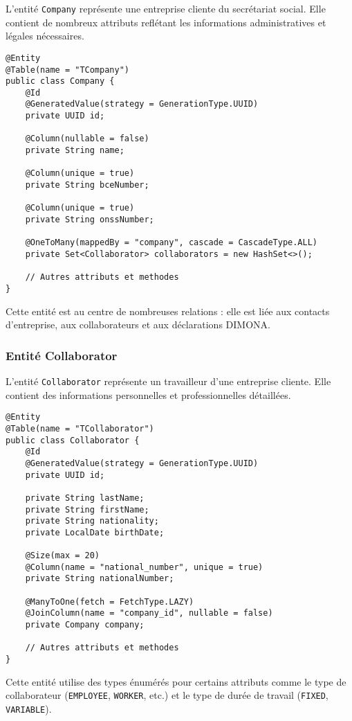 L'entité \texttt{Company} représente une entreprise cliente du secrétariat social. Elle contient de nombreux attributs reflétant les informations administratives et légales nécessaires.

\begin{lstlisting}
@Entity
@Table(name = "TCompany")
public class Company {
    @Id
    @GeneratedValue(strategy = GenerationType.UUID)
    private UUID id;
    
    @Column(nullable = false)
    private String name;
    
    @Column(unique = true)
    private String bceNumber;
    
    @Column(unique = true)
    private String onssNumber;
    
    @OneToMany(mappedBy = "company", cascade = CascadeType.ALL)
    private Set<Collaborator> collaborators = new HashSet<>();
    
    // Autres attributs et methodes
}
\end{lstlisting}

Cette entité est au centre de nombreuses relations : elle est liée aux contacts d'entreprise, aux collaborateurs et aux déclarations DIMONA.

\subsubsection{Entité Collaborator}

L'entité \texttt{Collaborator} représente un travailleur d'une entreprise cliente. Elle contient des informations personnelles et professionnelles détaillées.

\begin{lstlisting}
@Entity
@Table(name = "TCollaborator")
public class Collaborator {
    @Id
    @GeneratedValue(strategy = GenerationType.UUID)
    private UUID id;
    
    private String lastName;
    private String firstName;
    private String nationality;
    private LocalDate birthDate;
    
    @Size(max = 20)
    @Column(name = "national_number", unique = true)
    private String nationalNumber;
    
    @ManyToOne(fetch = FetchType.LAZY)
    @JoinColumn(name = "company_id", nullable = false)
    private Company company;
    
    // Autres attributs et methodes
}
\end{lstlisting}

Cette entité utilise des types énumérés pour certains attributs comme le type de collaborateur (\texttt{EMPLOYEE}, \texttt{WORKER}, etc.) et le type de durée de travail (\texttt{FIXED}, \texttt{VARIABLE}).

